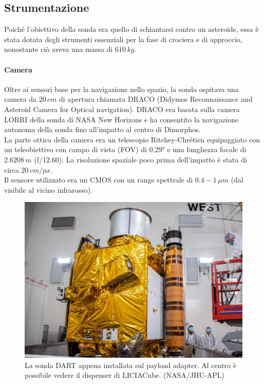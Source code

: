\documentclass[a4paper,11pt,openright]{book}
\begin{document}
\subsection{Strumentazione}
Poiché l'obiettivo della sonda era quello di schiantarsi contro un asteroide, essa è stata dotata degli strumenti essenziali per la fase di crociera e di approccio, nonostante ciò aveva una massa di $610\,kg$.

\paragraph*{Camera}
Oltre ai sensori base per la navigazione nello spazio, la sonda ospitava una camera da $20\,cm$ di apertura chiamata DRACO (Didymos Reconnaissance and Asteroid Camera for Optical navigation). DRACO era basata sulla camera LORRI della sonda di NASA New Horizons e ha consentito la navigazione autonoma della sonda fino all'impatto al centro di Dimorphos.\\
La parte ottica della camera era un telescopio Ritchey-Chrétien equipaggiato con un teleobiettivo con campo di vista (FOV) di 0.29° e una lunghezza focale di $2.6208\,m$ (f/12.60). La risoluzione spaziale poco prima dell'impatto è stata di circa $20\,cm/px$.\\
Il sensore utilizzato era un CMOS con un range spettrale di $0.4-1\,\mu m$ (dal visibile al vicino infrarosso).

\begin{figure}
    \centering
    \includegraphics[scale=0.4]{figure/dart_cleanroom.jpg}
    \caption[La sonda DART nella clean room.]{La sonda DART appena installata sul payload adapter. Al centro è possibile vedere il dispenser di LICIACube. (NASA/JHU-APL)}
    \label{fig:dart_cleanroom}
\end{figure}
\end{document}
